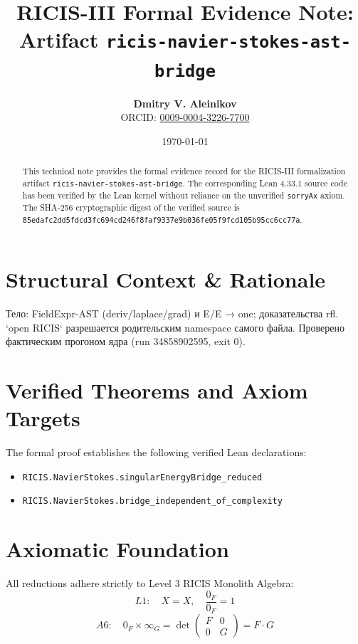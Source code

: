 \documentclass[11pt,a4paper]{article}
\title{\textbf{RICIS-III Formal Evidence Note:\\Artifact \texttt{ricis-navier-stokes-ast-bridge}}}
\author{\textbf{Dmitry V. Aleinikov}\\ORCID: \href{https://orcid.org/0009-0004-3226-7700}{0009-0004-3226-7700}}
\date{\today}
\begin{document}
\maketitle

\begin{abstract}
This technical note provides the formal evidence record for the RICIS-III formalization artifact \texttt{ricis-navier-stokes-ast-bridge}.
The corresponding Lean 4.33.1 source code has been verified by the Lean kernel without reliance on the unverified \texttt{sorryAx} axiom.
The SHA-256 cryptographic digest of the verified source is \texttt{85edafc2dd5fdcd3fc694cd246f8faf9337e9b036fe05f9fcd105b95cc6cc77a}.
\end{abstract}

\section{Structural Context & Rationale}
Тело: FieldExpr-AST (deriv/laplace/grad) и E/E → one; доказательства rfl. `open RICIS` разрешается родительским namespace самого файла. Проверено фактическим прогоном ядра (run 34858902595, exit 0).

\section{Verified Theorems and Axiom Targets}
The formal proof establishes the following verified Lean declarations:
\begin{itemize}
  \item \texttt{RICIS.NavierStokes.singularEnergyBridge_reduced}
  \item \texttt{RICIS.NavierStokes.bridge_independent_of_complexity}
\end{itemize}

\section{Axiomatic Foundation}
All reductions adhere strictly to Level 3 RICIS Monolith Algebra:
\begin{equation}
L1: \quad X = X, \quad \frac{0_F}{0_F} = 1
\end{equation}
\begin{equation}
A6: \quad 0_F \times \infty_G = \det\begin{pmatrix} F & 0 \\ 0 & G \end{pmatrix} = F \cdot G
\end{equation}
\end{document}
